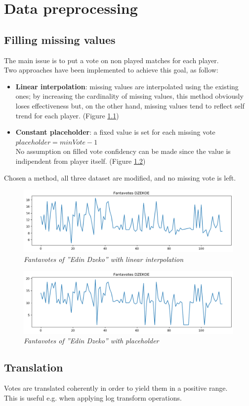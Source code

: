 \chapter {Data preprocessing}

\section{Filling missing values}

The main issue is to put a vote on non played matches for each player.
\\
Two approaches have been implemented to achieve this goal, as follow:
\begin{itemize}
\item \textbf{Linear interpolation}: missing values are interpolated using the existing ones; by increasing the cardinality of missing values, this method obviously loses effectiveness but, on the other hand, missing values tend to reflect self trend for each player. (Figure \ref{fig:linear_interpolation})  
\item \textbf{Constant placeholder}: a fixed value is set for each missing vote 
\\
$placeholder = minVote - 1$
\\
No assumption on filled vote confidency can be made since the value is indipendent from player itself. (Figure \ref{fig:placeholder})
\end{itemize}

Chosen a method, all three dataset are modified, and no missing vote is left.

\begin{figure}[H]
  \includegraphics[scale=0.5]{images/dzeko_linear_interpolation_fantavotes.png}
   \centering  
   \caption{\textit{Fantavotes of ''Edin Dzeko'' with \textit{linear interpolation}}}
  \label{fig:linear_interpolation}
\end{figure}

\begin{figure}[H]
  \includegraphics[scale=0.5]{images/dzeko_placeholder_fantavotes.png}
   \centering  
   \caption{\textit{Fantavotes of ''Edin Dzeko'' with \textit{placeholder}}}
  \label{fig:placeholder}
\end{figure}

\section{Translation}

Votes are translated coherently in order to yield them in a positive range.
\\
This is useful e.g. when applying log transform operations. 

